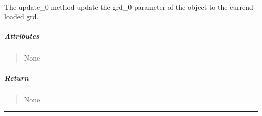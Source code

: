 \documentclass[letterpaper,10pt,english]{sphinxmanual}
\begin{document}
\paragraph{}
\label{\detokenize{GRID_doc/OCEAN_TIME_GRID_doc:id2}}

\begin{fulllineitems}
\label{\detokenize{GRID_doc/OCEAN_TIME_GRID_doc:SL_C0de.grid.OCEAN_TIME_GRID.update_0}}
\pysigstartsignatures
{}
\pysigstopsignatures{}\label{\detokenize{GRID_doc/OCEAN_TIME_GRID_doc:update-0-oce}}
\sphinxAtStartPar
The update\_0 method update the grd\_0 parameter of the object to the currend loaded grd.


\subparagraph{Attributes}
\label{\detokenize{GRID_doc/OCEAN_TIME_GRID_doc:id3}}\begin{quote}

\sphinxAtStartPar
None
\end{quote}


\subparagraph{Return}
\label{\detokenize{GRID_doc/OCEAN_TIME_GRID_doc:return}}\begin{quote}

\sphinxAtStartPar
None
\end{quote}

\end{fulllineitems}



\bigskip\hrule\bigskip

\end{document}

